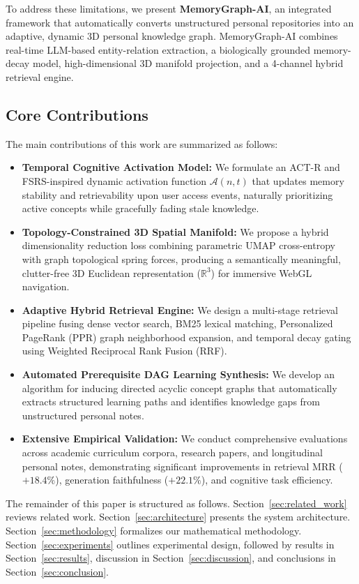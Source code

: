To address these limitations, we present \textbf{MemoryGraph-AI}, an integrated framework that automatically converts unstructured personal repositories into an adaptive, dynamic 3D personal knowledge graph. MemoryGraph-AI combines real-time LLM-based entity-relation extraction, a biologically grounded memory-decay model, high-dimensional 3D manifold projection, and a 4-channel hybrid retrieval engine.

\subsection{Core Contributions}
The main contributions of this work are summarized as follows:
\begin{itemize}
    \item \textbf{Temporal Cognitive Activation Model:} We formulate an ACT-R and FSRS-inspired dynamic activation function $\mathcal{A}(n, t)$ that updates memory stability and retrievability upon user access events, naturally prioritizing active concepts while gracefully fading stale knowledge.
    \item \textbf{Topology-Constrained 3D Spatial Manifold:} We propose a hybrid dimensionality reduction loss combining parametric UMAP cross-entropy with graph topological spring forces, producing a semantically meaningful, clutter-free 3D Euclidean representation ($\mathbb{R}^3$) for immersive WebGL navigation.
    \item \textbf{Adaptive Hybrid Retrieval Engine:} We design a multi-stage retrieval pipeline fusing dense vector search, BM25 lexical matching, Personalized PageRank (PPR) graph neighborhood expansion, and temporal decay gating using Weighted Reciprocal Rank Fusion (RRF).
    \item \textbf{Automated Prerequisite DAG Learning Synthesis:} We develop an algorithm for inducing directed acyclic concept graphs that automatically extracts structured learning paths and identifies knowledge gaps from unstructured personal notes.
    \item \textbf{Extensive Empirical Validation:} We conduct comprehensive evaluations across academic curriculum corpora, research papers, and longitudinal personal notes, demonstrating significant improvements in retrieval MRR ($+18.4\%$), generation faithfulness ($+22.1\%$), and cognitive task efficiency.
\end{itemize}

The remainder of this paper is structured as follows. Section~\ref{sec:related_work} reviews related work. Section~\ref{sec:architecture} presents the system architecture. Section~\ref{sec:methodology} formalizes our mathematical methodology. Section~\ref{sec:experiments} outlines experimental design, followed by results in Section~\ref{sec:results}, discussion in Section~\ref{sec:discussion}, and conclusions in Section~\ref{sec:conclusion}.
